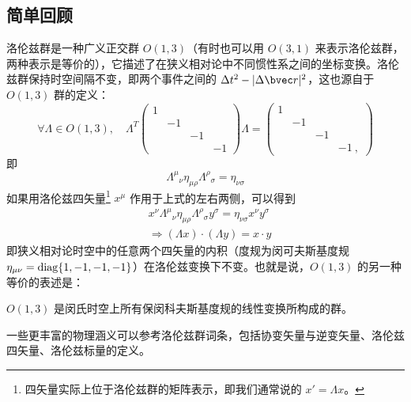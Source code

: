 

\subsection{简单回顾}
洛伦兹群是一种广义正交群 $O(1,3)$（有时也可以用 $O(3,1)$ 来表示洛伦兹群，两种表示是等价的），它描述了在狭义相对论中不同惯性系之间的坐标变换。洛伦兹群保持时空间隔不变，即两个事件之间的 $\Delta t^2-|\Delta \bvec r|^2$，这也源自于 $O(1,3)$ 群的定义：
\begin{equation}
\forall \Lambda \in O(1,3),\quad \Lambda^T \begin{pmatrix}
1&&&\\
&-1&&\\
&&-1&\\
&&&-1
\end{pmatrix}\Lambda =\begin{pmatrix}
1&&&\\
&-1&&\\
&&-1&\\
&&&-1~,
\end{pmatrix}
\end{equation}
即
\begin{equation}
\Lambda^\mu{}_{\nu} \eta_{\mu\rho}\Lambda^{\rho}{}_{\sigma}=\eta_{\nu\sigma}
\end{equation}
如果用洛伦兹四矢量\footnote{四矢量实际上位于洛伦兹群的矩阵表示，即我们通常说的 $x'=\Lambda x$。} $x^\mu$ 作用于上式的左右两侧，可以得到
\begin{equation}
\begin{aligned}
&x^\nu \Lambda^{\mu}{}_\nu \eta_{\mu\rho} \Lambda^\rho{}_\sigma y^\sigma=\eta_{\nu\sigma} x^\nu y^\sigma\\
&\Rightarrow (\Lambda x)\cdot (\Lambda y)=x\cdot y
\end{aligned}
\end{equation}
即狭义相对论时空中的任意两个四矢量的内积（度规为闵可夫斯基度规 $\eta_{\mu\nu}=\rm diag\{1,-1,-1,-1\}$）在洛伦兹变换下不变。也就是说，$O(1,3)$ 的另一种等价的表述是：
\begin{definition}{}
$O(1,3)$ 是闵氏时空上所有保闵科夫斯基度规的线性变换所构成的群。
\end{definition}
一些更丰富的物理涵义可以参考洛伦兹群词条，包括协变矢量与逆变矢量、洛伦兹四矢量、洛伦兹标量的定义。
